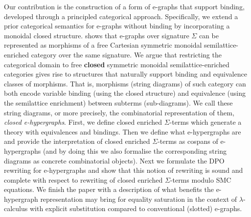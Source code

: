 Our contribution is the construction of a form of e-graphs that support binding, developed through a principled categorical approach.
Specifically, we extend a prior categorical semantics for e-graphs without binding by incorporating a monoidal closed structure.
\citet{tiurin2025equivalencehypergraphsdporewriting} shows that e-graphs over signature $\Sigma$ can be represented as morphisms of a free Cartesian symmetric monoidal semilattice-enriched category over the same signature.
We argue that restricting the categorical domain to free \textbf{closed} symmetric monoidal semilattice-enriched categories gives rise to structures that naturally support binding and equivalence classes of morphisms.
That is, morphisms (string diagrams) of such category can both encode variable binding (using the closed structure) and equivalence (using the semilattice enrichment) between subterms (sub-diagrams).
We call these string diagrams, or more precisely, the combinatorial representation of them, \emph{closed e-hypergraphs}.
First, we define closed enriched $\Sigma$-terms which generate a theory with equivalences and bindings.
Then we define what e-hypergraphs are and provide the interpretation of closed enriched $\Sigma$-terms as cospans of e-hypergraphs (and by doing this we also formalise the corresponding string diagrams as concrete combinatorial objects).
Next we formulate the DPO rewriting for e-hypergraphs and show that this notion of rewriting is sound and complete with respect to rewriting of closed enriched $\Sigma$-terms modulo SMC equations.
We finish the paper with a description of what benefits the e-hypergraph representation may bring for equality saturation in the context of $\lambda$-calculus with explicit substitution compared to conventional (slotted) e-graphs.

